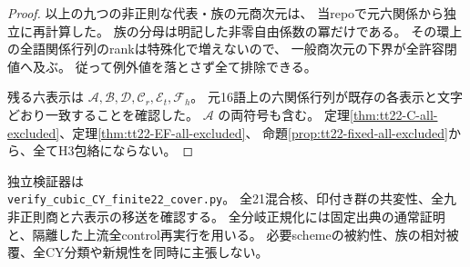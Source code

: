\begin{proof}
以上の九つの非正則な代表・族の元商次元は、
当repoで元六関係から独立に再計算した。
族の分母は明記した非零自由係数の冪だけである。
その環上の全語関係行列のrankは特殊化で増えないので、
一般商次元の下界が全許容閉値へ及ぶ。
従って例外値を落とさず全て排除できる。

残る六表示は $\mathcal A,\mathcal B,\mathcal D,\mathcal C_r,\mathcal E_t,\mathcal F_h$。
元16語上の六関係行列が既存の各表示と文字どおり一致することを確認した。
$\mathcal A$ の両符号も含む。
定理\ref{thm:tt22-C-all-excluded}、定理\ref{thm:tt22-EF-all-excluded}、
命題\ref{prop:tt22-fixed-all-excluded}から、全てH3包絡にならない。
\end{proof}

独立検証器は\\
\texttt{verify\_cubic\_CY\_finite22\_cover.py}。
全21混合核、印付き群の共変性、全九非正則商と六表示の移送を確認する。
全分岐正規化には固定出典の通常証明と、隔離した上流全control再実行を用いる。
必要schemeの被約性、族の相対被覆、全CY分類や新規性を同時に主張しない。
